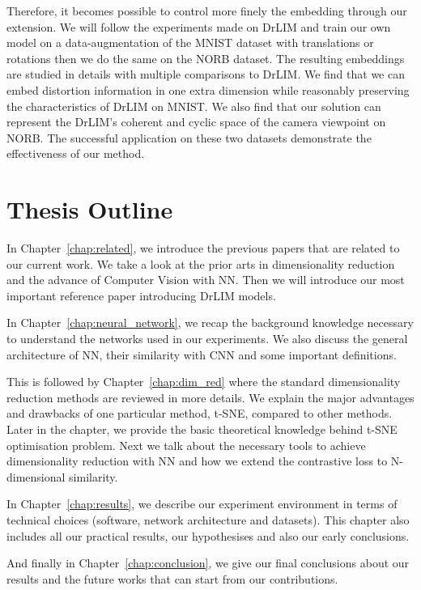\documentclass[a4paper,12pt]{report}
\begin{document}
Therefore, it becomes possible to control more finely the embedding through our extension.
We will follow the experiments made on DrLIM and train our own model on a data-augmentation of the MNIST dataset\cite{lecun1998mnist} with translations or rotations then we do the same on the NORB dataset\cite{lecun2004learning}.
The resulting embeddings are studied in details with multiple comparisons to DrLIM.
We find that we can embed distortion information in one extra dimension while reasonably preserving the characteristics of DrLIM on MNIST.
We also find that our solution can represent the DrLIM's coherent and cyclic space of the camera viewpoint on NORB.
The successful application on these two datasets demonstrate the effectiveness of our method.

\section{Thesis Outline}
In Chapter~\ref{chap:related}, we introduce the previous papers that are related to our current work.
We take a look at the prior arts in dimensionality reduction and the advance of Computer Vision with NN.
Then we will introduce our most important reference paper introducing DrLIM models.

In Chapter~\ref{chap:neural_network}, we recap the background knowledge necessary to understand the networks used in our experiments.
We also discuss the general architecture of NN, their similarity with CNN and some important definitions.

This is followed by Chapter~\ref{chap:dim_red} where the standard dimensionality reduction methods are reviewed in more details.
We explain the major advantages and drawbacks of one particular method, t-SNE, compared to other methods.
Later in the chapter, we provide the basic theoretical knowledge behind t-SNE optimisation problem.
Next we talk about the necessary tools to achieve dimensionality reduction with NN and how we extend the contrastive loss to N-dimensional similarity.

In Chapter~\ref{chap:results}, we describe our experiment environment in terms of technical choices (software, network architecture and datasets).
This chapter also includes all our practical results, our hypothesises and also our early conclusions.

And finally in Chapter~\ref{chap:conclusion}, we give our final conclusions about our results and the future works that can start from our contributions.
\end{document}
